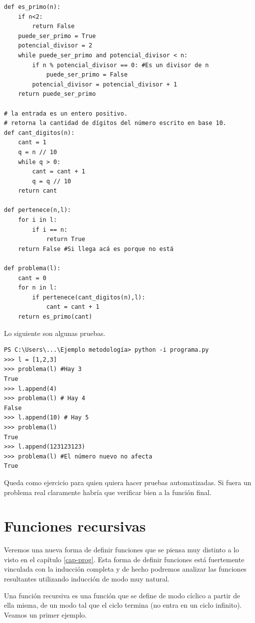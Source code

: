 \documentclass[a4paper, 12pt]{report}
\theoremstyle{definition}
\begin{document}
\begin{verbatim}
def es_primo(n):
    if n<2:
        return False
    puede_ser_primo = True
    potencial_divisor = 2
    while puede_ser_primo and potencial_divisor < n:
        if n % potencial_divisor == 0: #Es un divisor de n
            puede_ser_primo = False
        potencial_divisor = potencial_divisor + 1
    return puede_ser_primo
    
# la entrada es un entero positivo.
# retorna la cantidad de dígitos del número escrito en base 10.
def cant_digitos(n):
    cant = 1
    q = n // 10
    while q > 0:
        cant = cant + 1
        q = q // 10
    return cant

def pertenece(n,l):
    for i in l:
        if i == n:
            return True
    return False #Si llega acá es porque no está

def problema(l):
    cant = 0
    for n in l:
        if pertenece(cant_digitos(n),l):
            cant = cant + 1
    return es_primo(cant)
\end{verbatim}

Lo siguiente son algunas pruebas.
\begin{verbatim}
PS C:\Users\...\Ejemplo metodología> python -i programa.py
>>> l = [1,2,3] 
>>> problema(l) #Hay 3
True
>>> l.append(4)
>>> problema(l) # Hay 4
False
>>> l.append(10) # Hay 5
>>> problema(l)
True
>>> l.append(123123123) 
>>> problema(l) #El número nuevo no afecta
True
\end{verbatim}
Queda como ejercicio para quien quiera hacer pruebas automatizadas. Si fuera un problema real claramente habría que verificar bien a la función final.


\chapter{Funciones recursivas}


Veremos una nueva forma de definir funciones que se piensa muy distinto a lo visto en el capítulo \ref{cap-prog}. Esta forma de definir funciones está fuertemente vinculada con la inducción completa y de hecho podremos analizar las funciones resultantes utilizando inducción de modo muy natural.

Una función recursiva es una función que se define de modo cíclico a partir de ella misma, de un modo tal que el ciclo termina (no entra en un ciclo infinito). Veamos un primer ejemplo.
\end{document}
